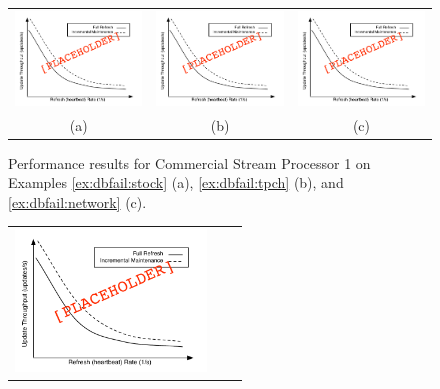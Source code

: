 \begin{figure}
\begin{center}
\begin{tabular}{ccc}
\includegraphics[width=2in]{../graphics-tmp/placeholder_stream_result} &
\includegraphics[width=2in]{../graphics-tmp/placeholder_stream_result} &
\includegraphics[width=2in]{../graphics-tmp/placeholder_stream_result} \\
(a) & (b) & (c)
\end{tabular}
\end{center}
\label{fig:dbfail:CSP1}
\caption{Performance results for Commercial Stream Processor 1 on Examples \ref{ex:dbfail:stock} (a), \ref{ex:dbfail:tpch} (b), and \ref{ex:dbfail:network} (c).}
\end{figure}\begin{figure}
\begin{center}
\begin{tabular}{ccc}
\includegraphics[width=2in]{../graphics-tmp/placeholder_stream_result} &

\end{tabular}
\end{center}
\end{figure}
